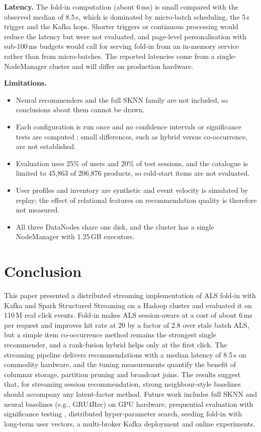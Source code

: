 \documentclass[10pt,journal]{IEEEtran}
\begin{document}
\textbf{Latency.} The fold-in computation (about 6\,ms) is small compared with the observed median of 8.5\,s, which is dominated by micro-batch scheduling, the 5\,s trigger and the Kafka hops. Shorter triggers or continuous processing would reduce the latency but were not evaluated, and page-level personalisation with sub-100\,ms budgets would call for serving fold-in from an in-memory service rather than from micro-batches. The reported latencies come from a single-NodeManager cluster and will differ on production hardware.

\textbf{Limitations.}
\begin{itemize}
\item Neural recommenders and the full SKNN family are not included, so conclusions about them cannot be drawn.
\item Each configuration is run once and no confidence intervals or significance tests are computed \cite{vinagre2021eval}; small differences, such as hybrid versus co-occurrence, are not established.
\item Evaluation uses 25\% of users and 20\% of test sessions, and the catalogue is limited to 45{,}863 of 206{,}876 products, so cold-start items are not evaluated.
\item User profiles and inventory are synthetic and event velocity is simulated by replay; the effect of relational features on recommendation quality is therefore not measured.
\item All three DataNodes share one disk, and the cluster has a single NodeManager with 1.25\,GB executors.
\end{itemize}

\section{Conclusion}
This paper presented a distributed streaming implementation of ALS fold-in with Kafka and Spark Structured Streaming on a Hadoop cluster and evaluated it on 110\,M real click events. Fold-in makes ALS session-aware at a cost of about 6\,ms per request and improves hit rate at 20 by a factor of 2.8 over stale batch ALS, but a simple item co-occurrence method remains the strongest single recommender, and a rank-fusion hybrid helps only at the first click. The streaming pipeline delivers recommendations with a median latency of 8.5\,s on commodity hardware, and the tuning measurements quantify the benefit of columnar storage, partition pruning and broadcast joins. The results suggest that, for streaming session recommendation, strong neighbour-style baselines should accompany any latent-factor method. Future work includes full SKNN and neural baselines (e.g., GRU4Rec) on GPU hardware, prequential evaluation with significance testing \cite{vinagre2021eval}, distributed hyper-parameter search, seeding fold-in with long-term user vectors, a multi-broker Kafka deployment and online experiments.
\end{document}
